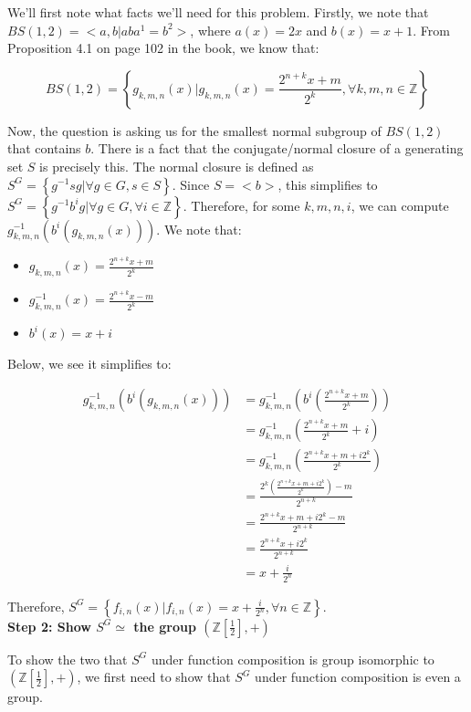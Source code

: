 \documentclass[12pt]{article}%
\newcommand{\Z}{\mathbb{Z}}
\begin{document}
We'll first note what facts we'll need for this problem. Firstly, we note that $BS(1,2)=<a,b|aba^1=b^2>$,
where $a(x)=2x$ and $b(x)=x+1$.  From Proposition 4.1 on page 102 in the book, we know that:

\begin{equation}
BS(1,2)=\left\{g_{k,m,n}(x) | g_{k,m,n}(x)=\frac{2^{n+k}x+m}{2^k}, \forall k, m, n \in \Z \right\}
\end{equation}

Now, the question is asking us for the smallest normal subgroup of $BS(1,2)$ that contains $b$. There is a
fact that the conjugate/normal closure of a generating set $S$ is precisely this. The normal closure is
defined as $S^G=\left\{g^{-1}sg|\forall g\in G, s\in S\right\}$. Since $S=<b>$, this simplifies to
$S^G=\left\{g^{-1}b^{i}g|\forall g\in G, \forall i \in \Z \right\}$. Therefore, for some $k, m, n, i$, we
can compute $g_{k,m,n}^{-1}(b^{i}(g_{k,m,n}(x)))$. We note that:

\begin{itemize}
\item $g_{k,m,n}(x)=\frac{2^{n+k}x+m}{2^k}$ 
\item $g_{k,m,n}^{-1}(x)=\frac{2^{n+k}x-m}{2^k}$ 
\item $b^{i}(x)=x+i$ %
\end{itemize}
Below, we see it simplifies to:

\begin{align*}
g_{k,m,n}^{-1}(b^{i}(g_{k,m,n}(x)))
&= g_{k,m,n}^{-1}\left(b^{i}\left(\frac{2^{n+k}x+m}{2^k}\right)\right) \\
&= g_{k,m,n}^{-1}\left(\frac{2^{n+k}x+m}{2^k}+i\right) \\
&= g_{k,m,n}^{-1}\left(\frac{2^{n+k}x+m+i2^k}{2^k}\right) \\
&= \frac{2^k\left(\frac{2^{n+k}x+m+i2^k}{2^k}\right)-m}{2^{n+k}} \\
&= \frac{2^{n+k}x+m+i2^k-m}{2^{n+k}} \\
&= \frac{2^{n+k}x+i2^k}{2^{n+k}} \\
&= x+\frac{i}{2^{n}}
\end{align*}

Therefore, $S^G=\left\{f_{i,n}(x)|f_{i,n}(x)=x+\frac{i}{2^{n}}, \forall n\in \Z\right\}$.\\

\textbf{Step 2: Show $S^G\simeq$  the group $\left(\Z\left[\frac{1}{2}\right],+\right)$}

To show the two that $S^G$ under function composition is group isomorphic to
$\left(\Z\left[\frac{1}{2}\right],+\right)$, we first need to show that $S^G$ under function composition
is even a group. \\
\end{document}

